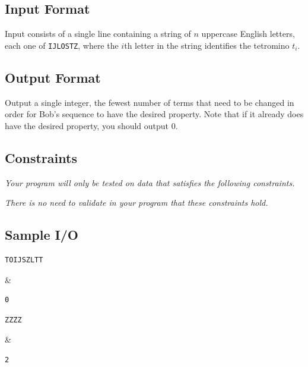 \newpage

\subsection*{Input Format}

Input consists of a single line containing a string of $n$ uppercase English letters, each one of \texttt{IJLOSTZ}, where the $i$th letter in the string identifies the tetromino $t_i$.

\subsection*{Output Format}

Output a single integer, the fewest number of terms that need to be changed in order for Bob's sequence to have the desired property.  Note that if it already does have the desired property, you should output $0$.

\subsection*{Constraints}

\textit{Your program will only be tested on data that satisfies the following constraints.}


\textit{There is no need to validate in your program that these constraints hold.}

\subsection*{Sample I/O}

\begin{sampleIO}
\begin{verbatim}
TOIJSZLTT
\end{verbatim}
&
\begin{verbatim}
0
\end{verbatim}
\end{sampleIO}

\begin{sampleIO}
\begin{verbatim}
ZZZZ
\end{verbatim}
&
\begin{verbatim}
2
\end{verbatim}
\end{sampleIO}


